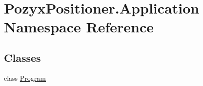 \hypertarget{namespace_pozyx_positioner_1_1_application}{}\section{Pozyx\+Positioner.\+Application Namespace Reference}
\label{namespace_pozyx_positioner_1_1_application}
\subsection*{Classes}
\begin{DoxyCompactItemize}
\item 
class \hyperlink{class_pozyx_positioner_1_1_application_1_1_program}{Program}
\end{DoxyCompactItemize}
